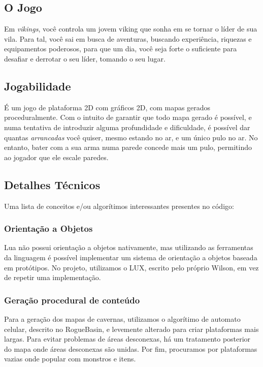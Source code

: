 
  \subsection{O Jogo}
    Em \textit{vikings}, você controla um jovem viking que sonha em se tornar o líder de sua vila. Para tal,
    você sai em busca de aventuras, buscando experiência, riquezas e equipamentos poderosos, para que um dia,
    você seja forte o suficiente para desafiar e derrotar o seu líder, tomando o seu lugar.
        
  \subsection{Jogabilidade}
    É um jogo de plataforma 2D com gráficos 2D, com mapas gerados proceduralmente. Com o intuito de garantir
    que todo mapa gerado é possível, e numa tentativa de introduzir alguma profundidade e dificuldade, é
    possível dar quantas \textit{arrancadas} você quiser, mesmo estando no ar, e um único pulo no ar. No
    entanto, bater com a sua arma numa parede concede mais um pulo, permitindo ao jogador que ele escale
    paredes.
    
  \subsection{Detalhes Técnicos}
    Uma lista de conceitos e/ou algorítimos interessantes presentes no código:
    
    \subsubsection{Orientação a Objetos}
      Lua não possui orientação a objetos nativamente, mas utilizando as ferramentas da linguagem é possível
      implementar um sistema de orientação a objetos baseada em protótipos.
      No projeto, utilizamos o LUX\footnotemark{}, escrito pelo próprio Wilson, em vez de repetir uma implementação.
      
    
    \subsubsection{Geração procedural de conteúdo}
      Para a geração dos mapas de cavernas, utilizamos o algorítimo de automato celular, descrito no RogueBasin,
      \cite{roguebasin:cellularautomata} e levemente alterado para criar plataformas mais largas. Para
      evitar problemas de áreas desconexas, há um tratamento posterior do mapa onde áreas desconexas são unidas.
      Por fim, procuramos por plataformas vazias onde popular com monstros e itens.